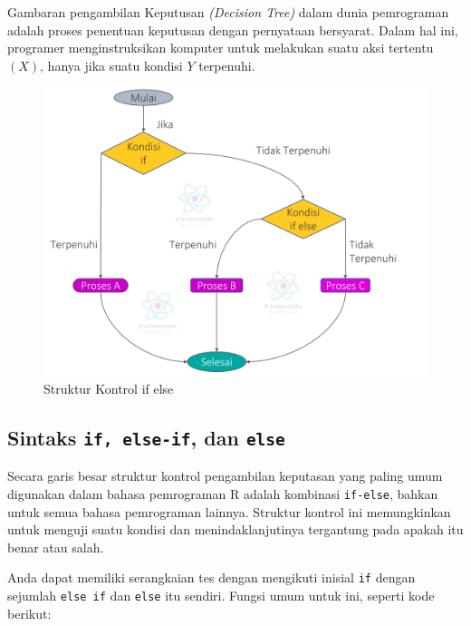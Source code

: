 \documentclass[
]{book}
\begin{document}
Gambaran pengambilan Keputusan \emph{(Decision Tree)} dalam dunia pemrograman adalah proses penentuan keputusan dengan pernyataan bersyarat. Dalam hal ini, programer menginstruksikan komputer untuk melakukan suatu aksi tertentu \((X)\), hanya jika suatu kondisi \(Y\) terpenuhi.

\begin{figure}

{\centering \includegraphics[width=1\linewidth]{./images/Bab6/if-else} 

}

\caption{Struktur Kontrol if else}\label{fig:if-else}
\end{figure}

\hypertarget{sintaks-if-else-if-dan-else}{%
\subsection{\texorpdfstring{Sintaks \texttt{if,\ else-if}, dan \texttt{else}}{Sintaks if, else-if, dan else}}\label{sintaks-if-else-if-dan-else}}

Secara garis besar struktur kontrol pengambilan keputasan yang paling umum digunakan dalam bahasa pemrograman R adalah kombinasi \texttt{if-else}, bahkan untuk semua bahasa pemrograman lainnya. Struktur kontrol ini memungkinkan untuk menguji suatu kondisi dan menindaklanjutinya tergantung pada apakah itu benar atau salah.

Anda dapat memiliki serangkaian tes dengan mengikuti inisial \texttt{if} dengan sejumlah \texttt{else\ if} dan \texttt{else} itu sendiri. Fungsi umum untuk ini, seperti kode berikut:
\end{document}
